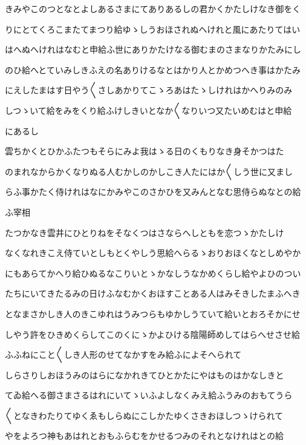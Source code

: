 \documentclass[a4paper,11pt,landscape]{ltjtarticle}
\begin{document}
\par\medskip
きみやこのつとなとよしあるさまにてありあるしの君かくかたしけなき御をく
\par\medskip
りにとてくろこまたてまつり給ゆゝしうおほされぬへけれと風にあたりてはい
\par\medskip
はへぬへけれはなむと申給ふ世にありかたけなる御むまのさまなりかたみにし
\par\medskip
のひ給へとていみしきふえの名ありけるなとはかり人とかめつへき事はかたみ
\par\medskip
にえしたまはす日やう〱さしあかりてこゝろあはたゝしけれはかへりみのみ
\par\medskip
しつゝいて給をみをくり給ふけしきいとなか〱なりいつ又たいめむはと申給
\par\medskip
にあるし
\par\medskip
雲ちかくとひかふたつもそらにみよ我はゝる日のくもりなき身そかつはた
\par\medskip
のまれなからかくなりぬる人むかしのかしこき人たにはか〱しう世に又まし
\par\medskip
らふ事かたく侍けれはなにかみやこのさかひを又みんとなむ思侍らぬなとの給
\par\medskip
ふ宰相
\par\medskip
たつかなき雲井にひとりねをそなくつはさならへしともを恋つゝかたしけ
\par\medskip
なくなれきこえ侍ていとしもとくやしう思給へらるゝおりおほくなとしめやか
\par\medskip
にもあらてかへり給ひぬるなこりいとゝかなしうなかめくらし給やよひのつい
\par\medskip
たちにいてきたるみの日けふなむかくおほすことある人はみそきしたまふへき
\par\medskip
となまさかしき人のきこゆれはうみつらもゆかしうていて給いとおろそかにせ
\par\medskip
しやう許をひきめくらしてこのくにゝかよひける陰陽師めしてはらへせさせ給
\par\medskip
ふふねにこと〱しき人形のせてなかすをみ給ふによそへられて
\par\medskip
しらさりしおほうみのはらになかれきてひとかたにやはものはかなしきと
\par\medskip
てゐ給へる御さまさるはれにいてゝいふよしなくみえ給ふうみのおもてうら
\par\medskip
〱となきわたりてゆくゑもしらぬにこしかたゆくさきおほしつゝけられて
\par\medskip
やをよろつ神もあはれとおもふらむをかせるつみのそれとなけれはとの給
\par\medskip
\end{document}
